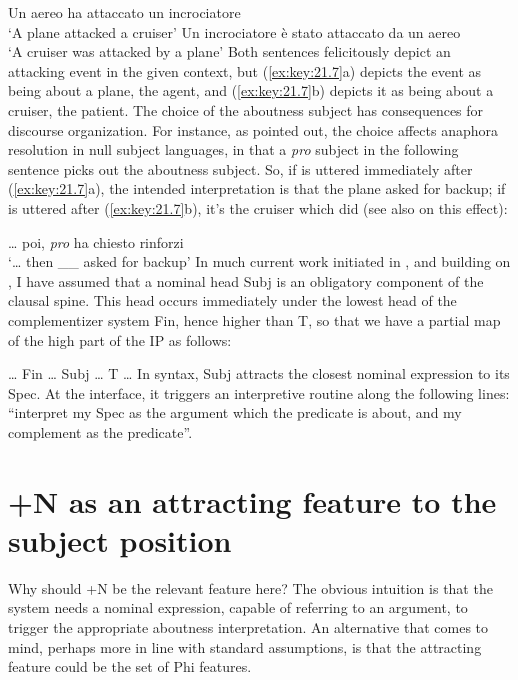 \documentclass[output=paper]{langsci/langscibook}
\begin{document}
\begin{exe}
\ea%
\label{ex:key:21.7}
    \ea Un aereo ha attaccato un incrociatore\\
         ‘A plane   attacked      a cruiser’
    \ex Un incrociatore è stato attaccato  da un aereo\\
         ‘A cruiser          was attacked       by a plane’
    \z
\z
%
Both sentences felicitously depict an attacking event in the given context, but
(\ref{ex:key:21.7}a) depicts the event as being about a plane, the agent, and
(\ref{ex:key:21.7}b) depicts it as being about a cruiser, the patient. The
choice of the aboutness subject has consequences for discourse organization.
For instance, as \citet{Calabrese1986} pointed out, the choice affects anaphora
resolution in null subject languages, in that a \emph{pro} subject in the
following sentence picks out the aboutness subject. So, if  is
uttered immediately after (\ref{ex:key:21.7}a), the intended interpretation is
that the plane asked for backup; if  is uttered after
(\ref{ex:key:21.7}b), it’s the cruiser which did (see also
\citealt{BellettiEtAl2007} on this effect):

\ea%
    \label{ex:key:21.8}
    \sn \dots{} poi, \emph{pro} ha chiesto rinforzi\\
    ‘\dots{} then \_\_ asked for backup’
\z
%
In much current work initiated in \citet{rizzicriterial}, and building on
\citet{Cardinaletti:2004a}, I have assumed that a nominal head Subj is an
obligatory component of the clausal spine. This head occurs immediately under
the lowest head of the complementizer system Fin, hence higher than T, so that
we have a partial map of the high part of the IP as follows:

\ea%
    \label{ex:key:21.9}
    \dots{} Fin \dots{} Subj\tss{[+N]} \dots{} T \dots{}
\z
%
In syntax, Subj\tss{[+N]} attracts the closest nominal expression to its Spec.
At the interface, it triggers an interpretive routine along the following
lines: “interpret my Spec as the argument which the predicate is about, and my
complement as the predicate”.

\section{+N as an attracting feature to the subject position}

Why should +N be the relevant feature here? The obvious intuition is that the
system needs a nominal expression, capable of referring to an argument, to
trigger the appropriate aboutness interpretation. An alternative that comes to
mind, perhaps more in line with standard assumptions, is that the attracting
feature could be the set of Phi features.


\end{exe}
\end{document}

